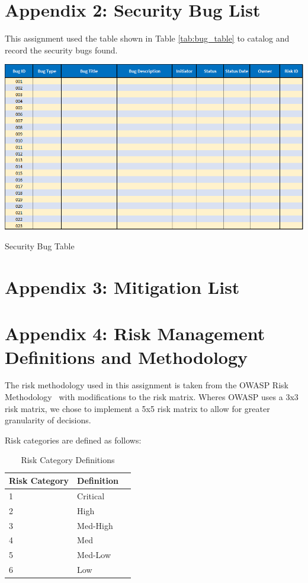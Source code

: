 \documentclass{tufte-book}
\begin{document}
\cleardoublepage
\chapter{Appendix 2: Security Bug List}
\label{ch:a2}
This assignment used the table shown in Table \ref{tab:bug_table} to catalog and record the security bugs found.

\begin{table}[h]
    \centering
    \includegraphics[width=\linewidth]{bug_table_2017-02-03_14-12-11}
    \caption{Security Bug Table}
    \label{tab:bug_table}
\end{table}

\cleardoublepage
\chapter{Appendix 3: Mitigation List}
\label{ch:a3}

\cleardoublepage
\chapter{Appendix 4: Risk Management Definitions and Methodology}
\label{ch:a4}
The risk methodology used in this assignment is taken from the OWASP Risk Methodology~\cite{owasprisk} with modifications to the risk matrix.  Wheres OWASP uses a 3x3 risk matrix, we chose to implement a 5x5 risk matrix to allow for greater granularity of decisions.





Risk categories are defined as follows:
\vfill
\begin{table}[h]
    \centering
    \begin{tabular}{l l l }
    \hline
    Risk Category & Definition \\
    \hline
    1 & Critical\\
    2 & High\\
    3 & Med-High\\
    4 & Med\\
    5 & Med-Low\\
    6 & Low \\
    \end{tabular}
    \caption{Risk Category Definitions}
    \label{tab:risk_cat}
\end{table}
\end{document}
